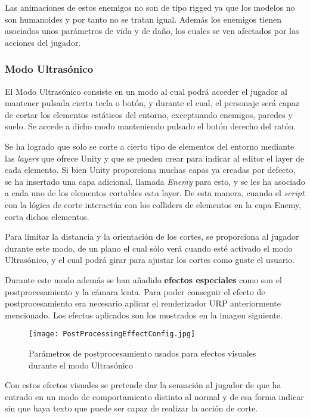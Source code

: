 Las animaciones de estos enemigos no son de tipo rigged ya que los modelos no son humanoides y por tanto no se tratan igual. Además los enemigos tienen asociados unos parámetros de vida y de daño, los cuales se ven afectados por las acciones del jugador.

\subsubsection{Modo Ultrasónico}

El Modo Ultrasónico consiste en un modo al cual podrá acceder el jugador al mantener pulsada cierta tecla o botón, y durante el cual, el personaje será capaz de cortar los elementos estáticos del entorno, exceptuando enemigos, paredes y suelo. Se accede a dicho modo manteniendo pulsado el botón derecho del ratón.

Se ha logrado que solo se corte a cierto tipo de elementos del entorno mediante las \textit{layers} que ofrece Unity y que se pueden crear para indicar al editor el layer de cada elemento. Si bien Unity proporciona muchas capas ya creadas por defecto, se ha insertado una capa adicional, llamada \textit{Enemy} para esto, y se les ha asociado a cada uno de los elementos cortables esta layer. De esta manera, cuando el \textit{script} con la lógica de corte interactúa con los colliders de elementos en la capa Enemy, corta dichos elementos.

Para limitar la distancia y la orientación de los cortes, se proporciona al jugador durante este modo, de un plano el cual sólo verá cuando esté activado el modo Ultrasónico, y el cual podrá girar para ajustar los cortes como guste el usuario. 

Durante este modo además se han añadido \textbf{efectos especiales} como son el postprocesamiento y la cámara lenta. Para poder conseguir el efecto de postprocesamiento era necesario aplicar el renderizador URP anteriormente mencionado. Los efectos aplicados son los mostrados en la imagen siguiente.

\begin{figure}[H]
    \centering
    \texttt{[image: PostProcessingEffectConfig.jpg]}
    \caption{Parámetros de postprocesamiento usados para efectos visuales durante el modo Ultrasónico}
\end{figure}

Con estos efectos visuales se pretende dar la sensación al jugador de que ha entrado en un modo de comportamiento distinto al normal y de esa forma indicar sin que haya texto que puede ser capaz de realizar la acción de corte.

